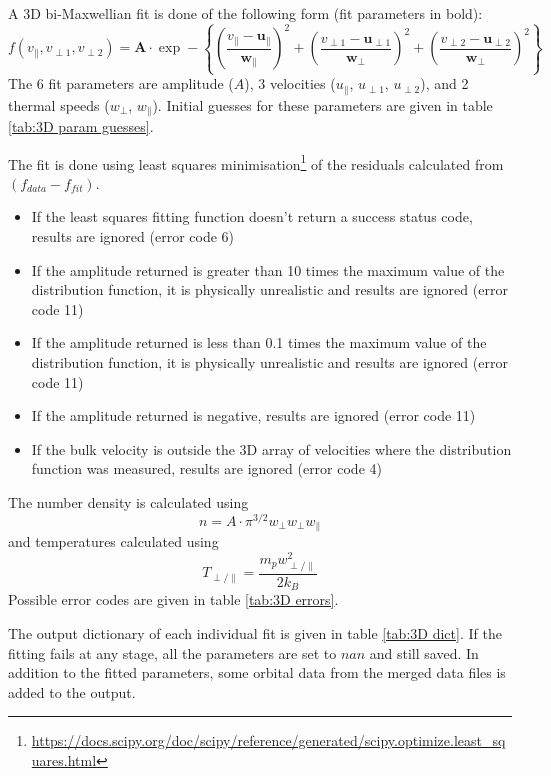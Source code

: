 \documentclass[11pt,a4paper]{article}
\begin{document}
A 3D bi-Maxwellian fit is done of the following form (fit parameters in bold):
\begin{equation}
	f \left ( v_{\parallel}, v_{\perp 1}, v_{\perp 2} \right ) = \mathbf{A} \cdot \exp - \left \{ \left ( \frac{v_{\parallel} - \mathbf{u}_{\parallel}}{\mathbf{w}_{\parallel}} \right )^{2} + \left ( \frac{v_{\perp 1} - \mathbf{u}_{\perp 1}}{\mathbf{w}_{\perp}} \right )^{2} + \left ( \frac{v_{\perp 2} - \mathbf{u}_{\perp 2}}{\mathbf{w}_{\perp}} \right )^{2} \right \}
\end{equation}
The 6 fit parameters are amplitude ($A$), 3 velocities ($u_{\parallel}$, $u_{\perp 1}$, $u_{\perp 2}$), and 2 thermal speeds ($w_{\perp}$, $w_{\parallel}$). Initial guesses for these parameters are given in table \ref{tab:3D param guesses}.

The fit is done using least squares minimisation\footnote{\url{https://docs.scipy.org/doc/scipy/reference/generated/scipy.optimize.least_squares.html}} of the residuals calculated from $\left (f_{data} - f_{fit}\right )$.
\begin{itemize}
	\item If the least squares fitting function doesn't return a success status code, results are ignored (error code 6)
	\item If the amplitude returned is greater than 10 times the maximum value of the distribution function, it is physically unrealistic and results are ignored (error code 11)
	\item If the amplitude returned is less than 0.1 times the maximum value of the distribution function, it is physically unrealistic and results are ignored (error code 11)
	\item If the amplitude returned is negative, results are ignored (error code 11)
	\item If the bulk velocity is outside the 3D array of velocities where the distribution function was measured, results are ignored (error code 4)
\end{itemize}
The number density is calculated using
\begin{equation}
	n = A \cdot \pi^{3/2}w_{\perp}w_{\perp}w_{\parallel}
\end{equation}
and temperatures calculated using
\begin{equation}
	T_{\perp / \parallel} = \frac{m_{p}w_{\perp / \parallel}^{2}}{2k_{B}}
\end{equation}
Possible error codes are given in table \ref{tab:3D errors}.

The output dictionary of each individual fit is given in table \ref{tab:3D dict}. If the fitting fails at any stage, all the parameters are set to $nan$ and still saved. In addition to the fitted parameters, some orbital data from the merged data files is added to the output.
\end{document}

